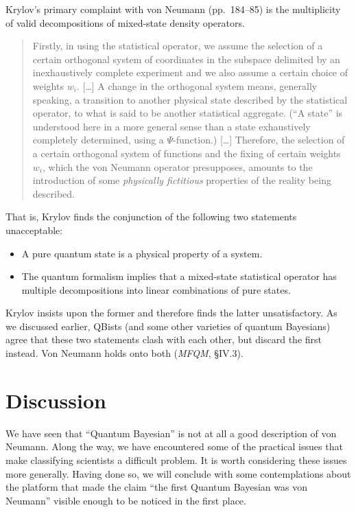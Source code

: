 \documentclass[aps,pra,superscriptaddress,12pt,tightenlines,nofootinbib]{revtex4-2}
\newcommand{\MFQM}{\textsl{MFQM}}
\begin{document}
Krylov's primary complaint with von Neumann (pp.\ 184--85) is the
multiplicity of valid decompositions of mixed-state density operators.
\begin{quotation}
Firstly, in using the statistical operator, we assume the selection of
a certain orthogonal system of coordinates in the subspace delimited
by an inexhaustively complete experiment and we also assume a certain
choice of weights $w_i$.  [\ldots\!]  A change in the orthogonal
system means, generally speaking, a transition to another physical
state described by the statistical operator, to what is said to be
another statistical aggregate.  (``A state'' is understood here in a
more general sense than a state exhaustively completely determined,
using a $\Psi$-function.)  [\ldots\!]  Therefore, the selection of a
certain orthogonal system of functions and the fixing of certain
weights $w_i$, which the von Neumann operator presupposes, amounts to
the introduction of some {\sl physically fictitious} properties of the
reality being described.
\end{quotation}
That is, Krylov finds the conjunction of the following two statements
unacceptable:
\begin{itemize}
\item A pure quantum state is a physical property of a system.
\item The quantum formalism implies that a mixed-state statistical
  operator has multiple decompositions into linear combinations of
  pure states.
\end{itemize}
Krylov insists upon the former and therefore finds the latter
unsatisfactory.  As we discussed earlier, QBists (and some other
varieties of quantum Bayesians) agree that these two statements clash
with each other, but discard the first instead.  Von Neumann holds
onto both (\MFQM, \S IV.3).

\section{Discussion}

We have seen that ``Quantum Bayesian'' is not at all a good
description of von Neumann.  Along the way, we have encountered some
of the practical issues that make classifying scientists a difficult
problem.  It is worth considering these issues more generally.  Having
done so, we will conclude with some contemplations about the platform
that made the claim ``the first Quantum Bayesian was von Neumann''
visible enough to be noticed in the first place.
\end{document}

